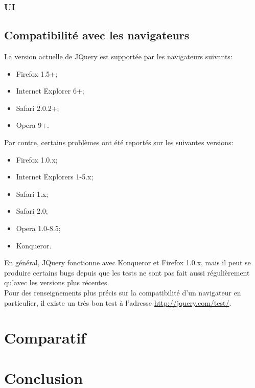 \documentclass[10pt,a4paper,titlepage]{article}
\begin{document}
\subsubsection{UI}

\subsection{Compatibilité avec les navigateurs}
La version actuelle de JQuery est supportée par les navigateurs suivants:

\begin{itemize}
	\item {Firefox 1.5+;}
	\item {Internet Explorer 6+;}
	\item {Safari 2.0.2+;}
	\item {Opera 9+.\\}
\end{itemize}

Par contre, certains problèmes ont été reportés sur les suivantes versions:
\begin{itemize}
	\item {Firefox 1.0.x;}
	\item {Internet Explorers 1-5.x;}
	\item {Safari 1.x;}
	\item {Safari 2.0;}
	\item {Opera 1.0-8.5;}
	\item {Konqueror.\\}
\end{itemize}

En général, JQuery fonctionne avec Konqueror et Firefox 1.0.x, mais il peut se produire certains bugs depuis que les tests ne sont pas fait aussi régulièrement qu'avec les versions plus récentes.\\

Pour des renseignements plus précis sur la compatibilité d'un navigateur en particulier, il existe un très bon test à l'adresse \url{http://jquery.com/test/}.

\newpage
\section{Comparatif}

\newpage
\section{Conclusion}

% 
% 
% 
% 
\end{document}
